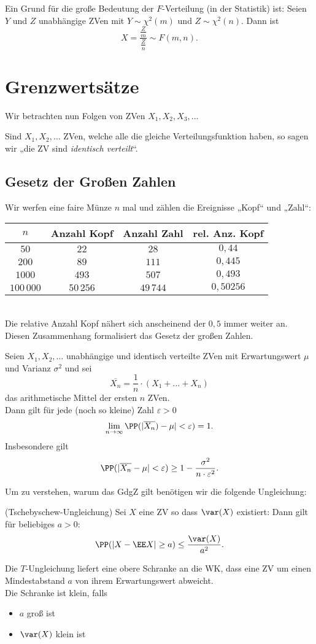 Ein Grund für die große Bedeutung der $ F $-Verteilung (in der Statistik) ist:
 Seien $ Y $ und $ Z $ unabhängige ZVen mit $ Y\sim \chi^{2} (m) $ und $ Z \sim \chi^{2}(n) $. Dann ist 
\[ X=\frac{\frac{Z}{m}}{\frac{Z}{n}}\sim F(m,n) \text{.} \]
\section{Grenzwertsätze}

Wir betrachten nun Folgen von ZVen $X_1, X_2, X_3, \ldots$

 Sind $X_1, X_2, \ldots$ ZVen, welche alle die gleiche Verteilungsfunktion haben, so sagen wir „die ZV sind \emph{identisch verteilt}“.

\subsection{Gesetz der Großen Zahlen}
 Wir werfen eine faire Münze $n$ mal und zählen die Ereignisse „Kopf“ und „Zahl“:\\
\begin{tabular}{c | c | c | c}
	$n$ & Anzahl Kopf & Anzahl Zahl & rel. Anz. Kopf\\\hline
	$50$ & $22$ & $28$ & $0,44$\\
	$200$& $89$& $111$ & $0,445$\\
	$1000$ & $493$& $507$& $0,493$\\
	$100\,000$& $50\,256$&$49\,744$& $0,50256$
\end{tabular}\\
Die relative Anzahl Kopf nähert sich anscheinend der $0,5$ immer weiter an.\\
Diesen Zusammenhang formalisiert das Gesetz der großen Zahlen.

 Seien $X_1, X_2, \ldots$ unabhängige und identisch verteilte ZVen mit Erwartungswert $\mu$ und Varianz $\sigma^{2}$ und sei
\[ \overline{X_n}=\frac{1}{n}\cdot (X_1 + \ldots + X_n) \]
das arithmetische Mittel der ersten $n$ ZVen.\\
Dann gilt für jede (noch so kleine) Zahl $\varepsilon >0$
\[ \lim_{n\to \infty} \PP(|\overline{X_n}) -\mu| < \varepsilon) = 1 \text{.}\]
Insbesondere gilt
\[ \PP(|\overline{X_n}-\mu | < \varepsilon)\geq 1-\frac{\sigma^{2}}{n \cdot \varepsilon^{2}} \text{.} \]

Um zu verstehen, warum das GdgZ gilt benötigen wir die folgende Ungleichung:

 (Tschebyschew-Ungleichung) Sei $X$ eine ZV so dass $\var(X)$ existiert: Dann gilt für beliebiges $a>0$:
\[ \PP(|X-\EE X| \geq a) \leq \frac{\var(X)}{a^{2}} \text{.} \]

 Die $T$-Ungleichung liefert eine obere Schranke an die WK, dass eine ZV um einen Mindestabstand $a$ von ihrem Erwartungswert abweicht.\\
Die Schranke ist klein, falls
\begin{itemize}
	\item $a$ groß ist
	\item $\var(X)$ klein ist
\end{itemize}


